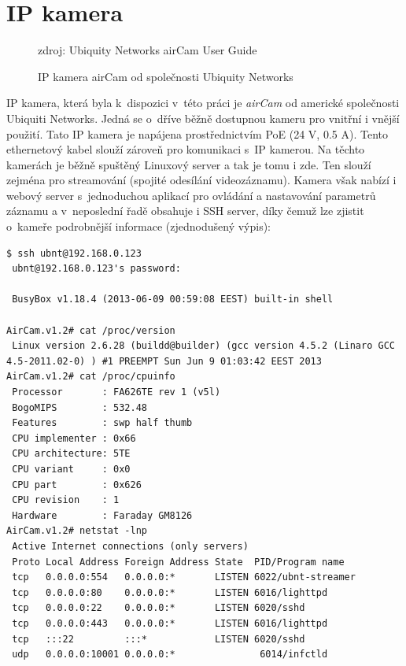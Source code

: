 
\section{IP kamera}

\begin{figure}[h]
    \centering
	\caption{IP kamera airCam od společnosti Ubiquity Networks}
	\small zdroj: Ubiquity Networks airCam User Guide
	\label{fig:zakladniNavrh}
\end{figure}

IP kamera, která byla k~dispozici v~této práci je \textit{airCam} \cite{aircam} od americké společnosti Ubiquiti Networks. Jedná se o~dříve běžně dostupnou kameru pro vnitřní i vnější použití. Tato IP kamera je napájena prostřednictvím PoE (24 V, 0.5 A). Tento ethernetový kabel slouží zároveň pro komunikaci s~IP kamerou. Na těchto kamerách je běžně spuštěný Linuxový server a tak je tomu i zde. Ten slouží zejména pro streamování (spojité odesílání videozáznamu). Kamera však nabízí i webový server s~jednoduchou aplikací pro ovládání a nastavování parametrů záznamu a v~neposlední řadě obsahuje i SSH server, díky čemuž lze zjistit o~kameře podrobnější informace (zjednodušený výpis):

\begin{verbatim}
$ ssh ubnt@192.168.0.123
 ubnt@192.168.0.123's password: 

 BusyBox v1.18.4 (2013-06-09 00:59:08 EEST) built-in shell

AirCam.v1.2# cat /proc/version
 Linux version 2.6.28 (buildd@builder) (gcc version 4.5.2 (Linaro GCC 4.5-2011.02-0) ) #1 PREEMPT Sun Jun 9 01:03:42 EEST 2013
AirCam.v1.2# cat /proc/cpuinfo
 Processor       : FA626TE rev 1 (v5l)
 BogoMIPS        : 532.48
 Features        : swp half thumb 
 CPU implementer : 0x66
 CPU architecture: 5TE
 CPU variant     : 0x0
 CPU part        : 0x626
 CPU revision    : 1
 Hardware        : Faraday GM8126
AirCam.v1.2# netstat -lnp
 Active Internet connections (only servers)
 Proto Local Address Foreign Address State  PID/Program name    
 tcp   0.0.0.0:554   0.0.0.0:*       LISTEN 6022/ubnt-streamer
 tcp   0.0.0.0:80    0.0.0.0:*       LISTEN 6016/lighttpd
 tcp   0.0.0.0:22    0.0.0.0:*       LISTEN 6020/sshd
 tcp   0.0.0.0:443   0.0.0.0:*       LISTEN 6016/lighttpd
 tcp   :::22         :::*            LISTEN 6020/sshd
 udp   0.0.0.0:10001 0.0.0.0:*               6014/infctld
\end{verbatim}

